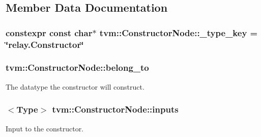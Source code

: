 \subsection{Member Data Documentation}
\subsubsection[{\texorpdfstring{\+\_\+type\+\_\+key}{_type_key}}]{\setlength{\rightskip}{0pt plus 5cm}constexpr const char$\ast$ tvm\+::\+Constructor\+Node\+::\+\_\+type\+\_\+key = \char`\"{}relay.\+Constructor\char`\"{}\hspace{0.3cm}{\ttfamily [static]}}\hypertarget{classtvm_1_1ConstructorNode_a41f40e2a99b4f65659a17b62294539fd}{}\label{classtvm_1_1ConstructorNode_a41f40e2a99b4f65659a17b62294539fd}
\subsubsection[{\texorpdfstring{belong\+\_\+to}{belong_to}}]{ tvm\+::\+Constructor\+Node\+::belong\+\_\+to}\hypertarget{classtvm_1_1ConstructorNode_a671fab9e6add1be16eca6e19efac99c5}{}\label{classtvm_1_1ConstructorNode_a671fab9e6add1be16eca6e19efac99c5}


The datatype the constructor will construct. 

\subsubsection[{\texorpdfstring{inputs}{inputs}}]{$<${\bf Type}$>$ tvm\+::\+Constructor\+Node\+::inputs}\hypertarget{classtvm_1_1ConstructorNode_a5e999221d27a09f0ae69fd94674349b1}{}\label{classtvm_1_1ConstructorNode_a5e999221d27a09f0ae69fd94674349b1}


Input to the constructor. 

